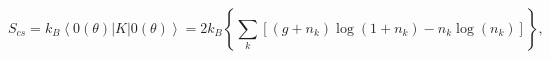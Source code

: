 \begin{equation}
S_{cs}=k_B\left\langle 0\left( \theta \right) \right| K\left| 0\left(
\theta \right) \right\rangle \!=
2k_{B}\left\{ \sum_{k}\left[ \left( g+n_{k}\right)
\log \left( 1+n_{k}\right) -n_{k}\log \left( n_{k}\right) \right] \right\} ,
\label{ecs}
\end{equation}

